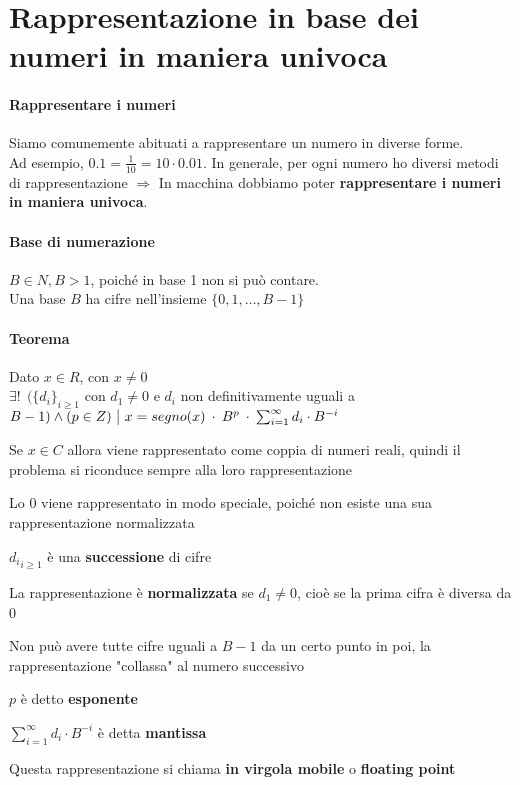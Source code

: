 \documentclass[10pt]{book}
\begin{document}
\section{Rappresentazione in base dei numeri in maniera univoca}
\paragraph{Rappresentare i numeri} Siamo comunemente abituati a rappresentare un numero in diverse forme.\\
Ad esempio, $0.1 = \frac{1}{10} = 10 \cdot 0.01$. In generale, per ogni numero ho diversi metodi di rappresentazione $\Rightarrow$ In macchina dobbiamo poter \textbf{rappresentare i numeri in maniera univoca}.
\paragraph{Base di numerazione} $B \in N, B > 1$, poiché in base 1 non si può contare.\\Una base $B$ ha cifre nell'insieme $\{0, 1, \ldots, B - 1\}$
\paragraph{Teorema} Dato $x \in R$, con $x \neq 0$\\$\exists!\:\:(\{d_i\}_{i \geq 1}$ con $d_1 \neq 0$ e $d_i$ non definitivamente uguali a $B - 1) \wedge (p \in Z) \:\:\vline\:\: x = segno(x)\:\cdot\:B^p\:\cdot\:\sum_{i=1}^\infty d_i \cdot B^{-i}$
\begin{list}{}{Considerazioni}
	\item Se $x \in C$ allora viene rappresentato come coppia di numeri reali, quindi il problema si riconduce sempre alla loro rappresentazione
	\item Lo $0$ viene rappresentato in modo speciale, poiché non esiste una sua rappresentazione normalizzata
	\item ${d_i}_{i \geq 1}$ è una \textbf{successione} di cifre
	\item La rappresentazione è \textbf{normalizzata} se $d_1 \neq 0$, cioè se la prima cifra è diversa da 0
	\item Non può avere tutte cifre uguali a $B-1$ da un certo punto in poi, la rappresentazione "collassa" al numero successivo
	\item $p$ è detto \textbf{esponente}
	\item $\sum_{i=1}^\infty d_i \cdot B^{-i}$ è detta \textbf{mantissa}
	\item Questa rappresentazione si chiama \textbf{in virgola mobile} o \textbf{floating point}
\end{list}
\begin{center}
\end{center} %
\pagebreak
\end{document}
